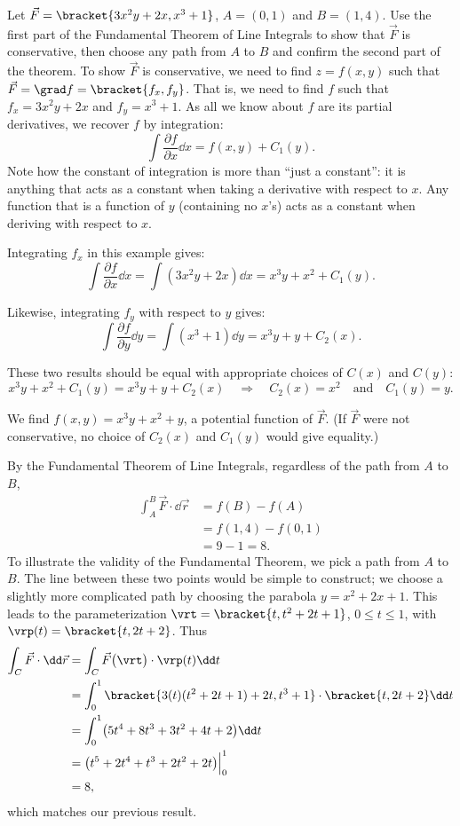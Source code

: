 \begin{example}\label{ex_livf5}%
Let $\vec F =\bracket{3x^2y+2x, x^3+1}$, $A = (0,1)$ and $B = (1,4)$. Use the first part of the Fundamental Theorem of Line Integrals to show that $\vec F$ is conservative, then choose any path from $A$ to $B$ and confirm the second part of the theorem.
\solution
To show $\vec F$ is conservative, we need to find $z = f(x,y)$ such that $\vec F = \grad f =\bracket{f_x, f_y}$. That is, we need to find $f$ such that $f_x = 3x^2y+2x$ and $f_y = x^3+1$. As all we know about $f$ are its partial derivatives, we recover $f$ by integration:
\[\int \frac{\partial f}{\partial x}\dd x = f(x,y) + C_1(y).\]
Note how the constant of integration is more than ``just a constant'': it is anything that acts as a constant when taking a derivative with respect to $x$. Any function that is a function of $y$ (containing no $x$'s) acts as a constant when deriving with respect to $x$.

Integrating $f_x$ in this example gives:
\[\int \frac{\partial f}{\partial x}\dd x = \int (3x^2y+2x)\dd x = x^3y+x^2 + C_1(y).\]

Likewise, integrating $f_y$ with respect to $y$ gives:
\[\int \frac{\partial f}{\partial y}\dd y = \int( x^3+1)\dd y = x^3y+ y + C_2(x).\]

These two results should be equal with appropriate choices of $C(x)$ and $C(y)$:
\[
x^3y+x^2 + C_1(y) = x^3y+ y + C_2(x)
\quad \Rightarrow\quad
C_2(x) = x^2 \quad \text{and}\quad C_1(y) = y.
\]

We find $f(x,y) = x^3y+x^2+y$, a potential function of $\vec F$. (If $\vec F$ were not conservative, no choice of $C_2(x)$ and $C_1(y)$ would give equality.)

By the Fundamental Theorem of Line Integrals, regardless of the path from $A$ to $B$, 
\begin{align*}
	\int_A^B\vec F\cdot\dd\vec r
	&= f(B) - f(A) \\
	&= f(1,4) - f(0,1) \\
	&= 9 - 1 = 8.
\end{align*}
To illustrate the validity of the Fundamental Theorem, we pick a path from $A$ to $B$. The line between these two points would be simple to construct; we choose a slightly more complicated path by choosing the parabola $y = x^2+2x+1$. This leads to the parameterization $\vrt =\bracket{t, t^2+2t+1}$, $0\leq t\leq 1$, with $\vrp(t) =\bracket{t, 2t+2}$. Thus
\begin{align*}
	\int_C \vec F\cdot\dd\vec r &= \int_C\vec F\bigl(\vrt\bigr)\cdot\vrp(t)\dd t\\
	&= \int_0^1\bracket{3(t)(t^2+2t+1)+2t, t^3+1}\cdot\bracket{t,2t+2}\dd t\\
	&= \int_0^1 \bigl(5t^4+8t^3+3t^2+4t+2\bigr)\dd t\\
	&= \bigl(t^5+2t^4+t^3+2t^2+2t\bigr)\Big|_0^1\\
	&= 8,
\end{align*}
which matches our previous result.
\end{example}

